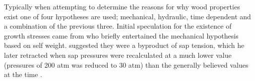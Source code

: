 Typically when attempting to determine the reasons for why wood properties exist
one of four hypotheses are used; mechanical, hydraulic, time dependent and a
combination of the previous three. Initial speculation for the existence of
growth stresses came from \citet{MARTLEY01011928} who briefly entertained the
mechanical hypothesis based on self weight. \citet{jacobs1945l} suggested they were a
byproduct of sap tension, which he later retracted when sap
pressures were recalculated at a much lower value (pressures of 200 atm was reduced to 30 atm) than the generally believed
values at the time \citep{jacobs1965l}. 